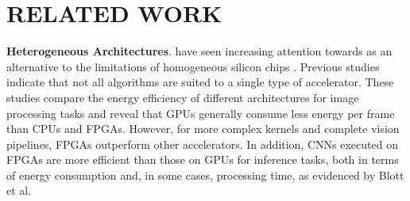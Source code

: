\documentclass[]{spie}  %
\begin{document}
\section{RELATED WORK}
\label{sec:background}



\textbf{Heterogeneous Architectures}. have seen increasing attention towards as an alternative to the limitations of homogeneous silicon chips \cite{RooLav17, KobRyoFuj20, XieLinKai17, ChoLeeLee22, Hosseinabady2019HeterogeneousFE}. Previous studies \cite{QasDenKri29} indicate that not all algorithms are suited to a single type of accelerator. These studies compare the energy efficiency of different architectures for image processing tasks and reveal that GPUs generally consume less energy per frame than CPUs and FPGAs. However, for more complex kernels and complete vision pipelines, FPGAs outperform other accelerators. In addition, CNNs executed on FPGAs are more efficient than those on GPUs for inference tasks, both in terms of energy consumption and, in some cases, processing time, as evidenced by Blott et al\cite{BloHalLis}.
\end{document}

